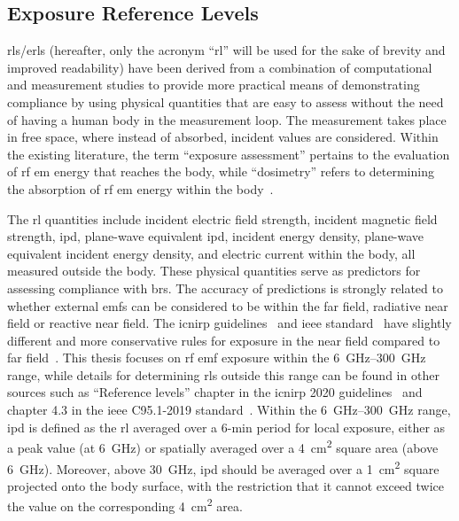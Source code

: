\subsection{Exposure Reference Levels}
\Gls{rl}s/\gls{erl}s (hereafter, only the acronym ``\gls{rl}'' will be used for the sake of brevity and improved readability) have been derived from a combination of computational and measurement studies to provide more practical means of demonstrating compliance by using physical quantities that are easy to assess without the need of having a human body in the measurement loop.
The measurement takes place in free space, where instead of absorbed, incident values are considered.
Within the existing literature, the term ``exposure assessment'' pertains to the evaluation of \gls{rf} \gls{em} energy that reaches the body, while ``dosimetry'' refers to determining the absorption of \gls{rf} \gls{em} energy within the body~\cite{Chou1996Radio}.

The \gls{rl} quantities include incident electric field strength, incident magnetic field strength, \gls{ipd}, plane-wave equivalent \gls{ipd}, incident energy density, plane-wave equivalent incident energy density, and electric current within the body, all measured outside the body.
These physical quantities serve as predictors for assessing compliance with \gls{br}s.
The accuracy of predictions is strongly related to whether external \gls{emf}s can be considered to be within the far field, radiative near field or reactive near field.
The \gls{icnirp} guidelines~\cite{ICNIRP2020Guidelines} and \gls{ieee} standard~\cite{IEEE2019Standard} have slightly different and more conservative rules for exposure in the near field compared to far field~\cite{Hirata2020Difference}.
This thesis focuses on \gls{rf} \gls{emf} exposure within the \SIrange{6}{300}{\GHz} range, while details for determining \gls{rl}s outside this range can be found in other sources such as ``Reference levels'' chapter in the \gls{icnirp} 2020 guidelines~\cite{ICNIRP2020Guidelines} and chapter 4.3 in the \gls{ieee} C95.1-2019 standard~\cite{IEEE2019Standard}.
Within the \SIrange{6}{300}{\GHz} range, \gls{ipd} is defined as the \gls{rl} averaged over a 6-min period for local exposure, either as a peak value (at \SI{6}{\GHz}) or spatially averaged over a \SI{4}{\cm\squared} square area (above \SI{6}{\GHz}).
Moreover, above \SI{30}{\GHz}, \gls{ipd} should be averaged over a \SI{1}{\cm\squared} square projected onto the body surface, with the restriction that it cannot exceed twice the value on the corresponding \SI{4}{\cm\squared} area.

